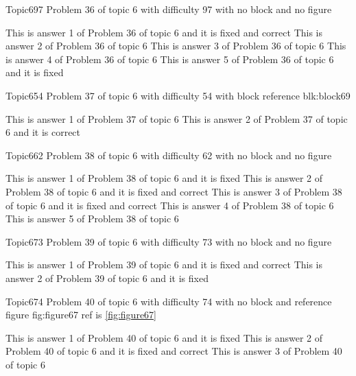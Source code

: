 \documentclass[master]{exam}
\begin{document}
\begin{problem}{Topic6}{97}
	Problem 36 of topic 6 with difficulty 97 with no block and no figure
	\begin{answers}
		 This is answer 1 of Problem 36 of topic 6 and it is fixed and correct
		\answer This is answer 2 of Problem 36 of topic 6 
		\answer This is answer 3 of Problem 36 of topic 6 
		\answer This is answer 4 of Problem 36 of topic 6 
		\answer[fixed] This is answer 5 of Problem 36 of topic 6 and it is fixed
	\end{answers}
\end{problem}

\begin{problem}[requires=blk:block69]{Topic6}{54}
	Problem 37 of topic 6 with difficulty 54 with block reference blk:block69
	\begin{answers}
		\answer This is answer 1 of Problem 37 of topic 6 
		\answer[correct] This is answer 2 of Problem 37 of topic 6 and it is correct
	\end{answers}
\end{problem}

\begin{problem}{Topic6}{62}
	Problem 38 of topic 6 with difficulty 62 with no block and no figure
	\begin{answers}
		\answer[fixed] This is answer 1 of Problem 38 of topic 6 and it is fixed
		 This is answer 2 of Problem 38 of topic 6 and it is fixed and correct
		 This is answer 3 of Problem 38 of topic 6 and it is fixed and correct
		\answer This is answer 4 of Problem 38 of topic 6 
		\answer This is answer 5 of Problem 38 of topic 6 
	\end{answers}
\end{problem}

\begin{problem}{Topic6}{73}
	Problem 39 of topic 6 with difficulty 73 with no block and no figure
	\begin{answers}
		 This is answer 1 of Problem 39 of topic 6 and it is fixed and correct
		\answer[fixed] This is answer 2 of Problem 39 of topic 6 and it is fixed
	\end{answers}
\end{problem}

\begin{problem}{Topic6}{74}
	Problem 40 of topic 6 with difficulty 74 with no block and reference figure fig:figure67 ref is \ref{fig:figure67}
	\begin{answers}
		\answer[fixed] This is answer 1 of Problem 40 of topic 6 and it is fixed
		 This is answer 2 of Problem 40 of topic 6 and it is fixed and correct
		\answer This is answer 3 of Problem 40 of topic 6 
	\end{answers}
\end{problem}
\end{document}
